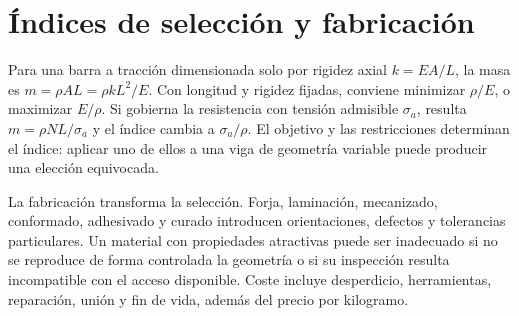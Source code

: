 \section{Índices de selección y fabricación}
Para una barra a tracción dimensionada solo por rigidez axial $k=EA/L$, la masa es $m=\rho AL=\rho kL^2/E$. Con longitud y rigidez fijadas, conviene minimizar $\rho/E$, o maximizar $E/\rho$. Si gobierna la resistencia con tensión admisible $\sigma_a$, resulta $m=\rho NL/\sigma_a$ y el índice cambia a $\sigma_a/\rho$. El objetivo y las restricciones determinan el índice: aplicar uno de ellos a una viga de geometría variable puede producir una elección equivocada.

La fabricación transforma la selección. Forja, laminación, mecanizado, conformado, adhesivado y curado introducen orientaciones, defectos y tolerancias particulares. Un material con propiedades atractivas puede ser inadecuado si no se reproduce de forma controlada la geometría o si su inspección resulta incompatible con el acceso disponible. Coste incluye desperdicio, herramientas, reparación, unión y fin de vida, además del precio por kilogramo.


